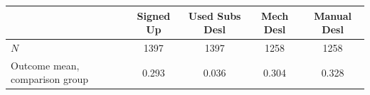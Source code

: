 \begin{tabular}{lcccc}
\hline\hline
 & Signed Up & Used Subs Desl & Mech Desl & Manual Desl \\
\hline
\hline
$N$ & 1397 & 1397 & 1258 & 1258 \\
Outcome mean, comparison group & 0.293 & 0.036 & 0.304 & 0.328 \\
\hline\hline
\end{tabular}
